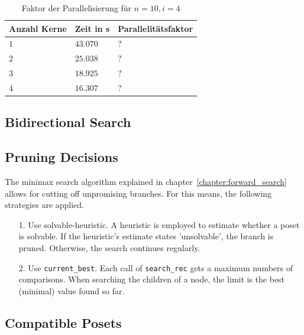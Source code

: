 \documentclass[10pt,journal,compsoc]{IEEEtran}
\begin{document}
\begin{table}
  \begin{tabular}{l|l|l}
    Anzahl Kerne & Zeit in s & Parallelitätsfaktor \\
    \hline
    $1$          & $43.070$  & $?$                 \\ %
    $2$          & $25.038$  & $?$                 \\
    $3$          & $18.925$  & $?$                 \\
    $4$          & $16.307$  & $?$                 \\
  \end{tabular}
  \centering
  \caption{Faktor der Parallelisierung für $n = 10, i = 4$}
  \label{table:backward-parallel}
\end{table}


\subsection{Bidirectional Search}

\subsection{Pruning Decisions}
The minimax search algorithm explained in chapter~\ref{chapter:forward_search} allows for cutting off unpromising branches. For this means, the following strategies are applied.

\begin{enumerate}
  \item[1.] 
    Use solvable-heuristic. A heuristic is employed to estimate whether a poset is solvable. If the heuristic's estimate states 'unsolvable', the branch is pruned.
    Otherwise, the search continues regularly.
  \item[2.] 
    Use \texttt{current\_best}. Each call of \texttt{search\_rec} gets a maximum numbers of comparisons. 
    When searching the children of a node, the limit is the best (minimal) value found so far.
    
\end{enumerate}

\subsection{Compatible Posets}
\end{document}
